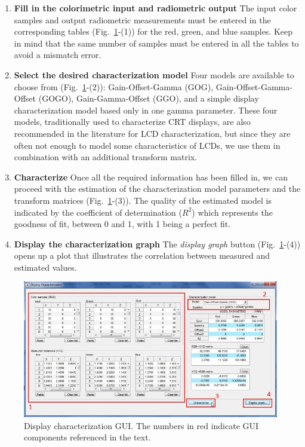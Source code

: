 \documentclass[a4paper,12pt,oneside]{article}
\begin{document}
\begin{enumerate}
	\item \textbf{Fill in the colorimetric input and radiometric output}
	The input color samples and output radiometric measurements must be entered in the corresponding tables (Fig.~\ref{fig:display_characterization_gui}-(1)) for the red, green, and blue samples. Keep in mind that the same number of samples must be entered in all the tables to avoid a mismatch error. 
	\item \textbf{Select the desired characterization model}
	Four models are available to choose from (Fig.~\ref{fig:display_characterization_gui}-(2)): Gain-Offset-Gamma (GOG), Gain-Offset-Gamma-Offset (GOGO), Gain-Gamma-Offset (GGO), and a simple display characterization model based only in one gamma parameter. These four models, traditionally used to characterize CRT displays, are also recommended in the literature for LCD characterization, but since they are often not enough to model some characteristics of LCDs, we use them in combination with an additional transform matrix.
	\item \textbf{Characterize}
	Once all the required information has been filled in, we can proceed with the estimation of the characterization model parameters and the transform matrices (Fig.~\ref{fig:display_characterization_gui}-(3)). The quality of the estimated model is indicated by the coefficient of determination ($R^2$) which represents the goodness of fit, between 0 and 1, with 1 being a perfect fit.
	\item \textbf{Display the characterization graph}
	The \textit{display graph} button (Fig.~\ref{fig:display_characterization_gui}-(4)) opens up a plot that illustrates the correlation between measured and estimated values.
\end{enumerate}

\begin{figure}[hp]
	\centering
	\includegraphics[width=1\textwidth]{images/display_characterization_gui.jpg}
	\caption{Display characterization GUI. The numbers in red indicate GUI components referenced in the text.}
	\label{fig:display_characterization_gui}
\end{figure}
\end{document}
